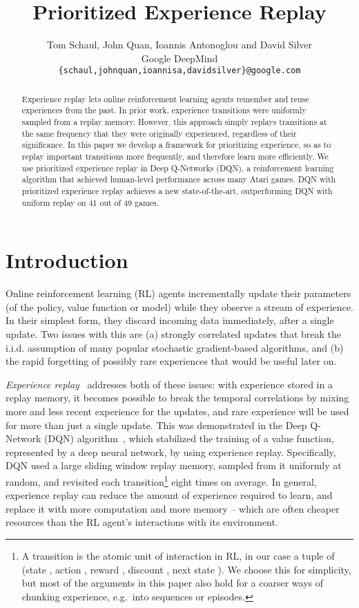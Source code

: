 \documentclass[a4paper]{article}
\title{Prioritized Experience Replay}
\author{Tom Schaul, John Quan, Ioannis Antonoglou and David Silver\\
Google DeepMind\\
\texttt{\{schaul,johnquan,ioannisa,davidsilver\}@google.com} \\
}
\begin{document}
\maketitle

\begin{abstract}
Experience replay lets online reinforcement learning agents remember and reuse experiences from the past. In prior work, experience transitions were uniformly sampled from a replay memory. However, this approach simply replays transitions at the same frequency that they were originally experienced, regardless of their significance. In this paper we develop a framework for prioritizing experience, so as to replay important transitions more frequently, and therefore learn more efficiently. We use prioritized experience replay in Deep Q-Networks (DQN), a reinforcement learning algorithm that achieved human-level performance across many Atari games. DQN with prioritized experience replay achieves a new state-of-the-art, outperforming DQN with uniform replay on 41 out of 49 games.
\end{abstract}

\section{Introduction}
Online reinforcement learning (RL) agents incrementally update their parameters
(of the policy, value function or model) while they observe a stream of
experience. In their simplest form, they discard incoming data immediately, after a single update.
Two issues with this are (a) strongly correlated updates that break the i.i.d. assumption 
of many popular stochastic gradient-based algorithms, and (b) the rapid forgetting of possibly
rare experiences that would be useful later on.

\emph{Experience replay}~\citep{lin-er} addresses both of these issues: with experience stored in a replay memory,
it becomes possible to break the temporal correlations by mixing more and less recent experience for the updates,
and rare experience will be used for more than just a single update.
This was demonstrated in the Deep Q-Network (DQN) algorithm~\citep{dqn-workshop,dqn-nature}, which stabilized the training of
a value function, represented by a deep neural network, by using experience replay. Specifically, DQN used a large sliding window replay memory, sampled from it uniformly at random, and revisited each transition\footnote{
A transition is the atomic unit of interaction in RL, in our case a tuple of 
(state , action , reward , discount , next state ). 
We choose this for simplicity, but most of the arguments in this paper also hold for a coarser ways of chunking experience, e.g.\ into sequences or episodes.
}
eight times on average.
In general, experience replay can reduce the amount of experience required to learn,
and replace it with more computation and more memory -- which are often cheaper resources than the RL agent's interactions with its environment.
\end{document}
